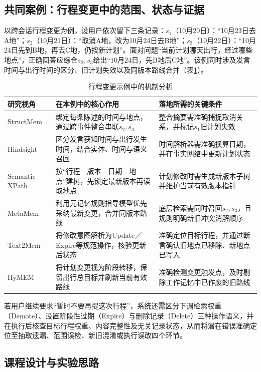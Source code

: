 \subsection{共同案例：行程变更中的范围、状态与证据}

以跨会话行程变更为例，设用户依次留下三条记录：$s_1$（10月20日）：“10月23日去A地”；$s_2$（10月21日）：“取消A地，改为10月24日去B地”；$s_3$（10月22日）：“10月24日先到B地，再去C地，仍按新计划”。面对问题“当前计划哪天出行，经过哪些地点”，正确回答应综合$s_2,s_3$给出“10月24日，先B地后C地”。该例同时涉及发言时间与出行时间的区分、旧计划失效以及同版本路线合并（表\ref{tab:shared-case}）。

\begin{table}[H]
    \centering\small
    \caption{行程变更示例中的机制分析}
    \label{tab:shared-case}
    \begin{tabularx}{\linewidth}{@{}>{\raggedright\arraybackslash}p{25mm}XX@{}}
        \toprule
        研究视角 & 在本例中的核心作用 & 落地所需的关键条件 \\
        \midrule
        StructMem & 绑定每条陈述的时间与地点，通过跨事件整合串联$s_2,s_3$ & 整合摘要需准确捕捉取消关系，并标记$s_1$旧计划失效 \\
        Hindsight & 区分发言获知时间与出行发生时间，结合实体、时间与语义召回 & 时间解析器需准确换算日期，并在事实网络中更新计划状态 \\
        Semantic XPath & 按“行程—版本—日期—地点”建树，先锁定最新版本再读取地点 & 计划修改时需生成新版本子树并维护当前有效版本指针 \\
        MetaMem & 利用元记忆规则指导模型优先采纳最新变更，合并同版本路线 & 底层检索需同时召回$s_2,s_3$，且规则明确新旧冲突消解顺序 \\
        Text2Mem & 将修改意图解析为Update／Expire等规范操作，核验更新后状态 & 准确定位目标行程，并通过断言确认旧地点已移除、新地点已写入 \\
        HyMEM & 将计划变更视为阶段转移，保留出行总目标并刷新当前有效路线 & 准确检测变更触发点，及时剔除工作记忆中已作废的旧路线 \\
        \bottomrule
    \end{tabularx}
\end{table}

若用户继续要求“暂时不要再提这次行程”，系统还需区分下调检索权重（Demote）、设置阶段性过期（Expire）与删除记录（Delete）三种操作语义，并在执行后核查目标行程权重、内容完整性及无关记录状态，从而将潜在错误准确定位至抽取遗漏、范围误检、新旧混淆或执行误改四个环节。

\subsection{课程设计与实验思路}

